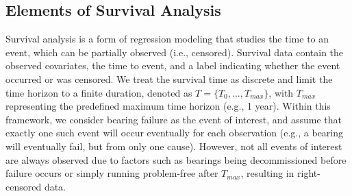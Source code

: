 \documentclass[letterpaper]{article} %
\begin{document}

\subsection{Elements of Survival Analysis}
Survival analysis is a form of regression modeling that studies the time to an event, which can be partially observed (i.e., censored). Survival data contain the observed covariates, the time to event, and a label indicating whether the event occurred or was censored. We treat the survival time as discrete and limit the time horizon to a finite duration, denoted as $T = \{T_{0}, ..., T_{max}\}$, with $T_{max}$ representing the predefined maximum time horizon (e.g., 1 year). Within this framework, we consider bearing failure as the event of interest, and assume that exactly one such event will occur eventually for each observation (e.g., a bearing will eventually fail, but from only one cause). However, not all events of interest are always observed due to factors such as bearings being decommissioned before failure occurs or simply running problem-free after $T_{max}$, resulting in right-censored data.
\end{document}
